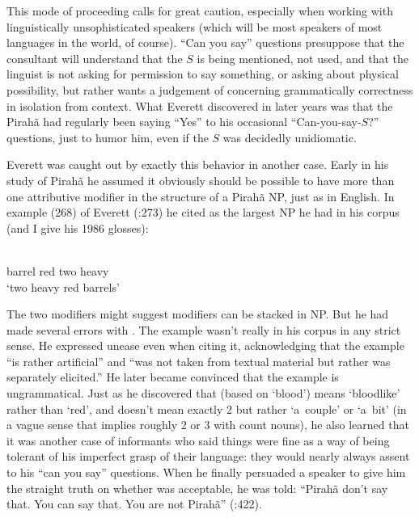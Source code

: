 \documentclass[output=paper,colorlinks,citecolor=brown
]{langscibook}
\begin{document}
This mode of proceeding calls for great caution, especially when
working with linguistically unsophisticated speakers (which will be
most speakers of most languages in the world, of course). ``Can you say''
questions presuppose that the consultant will understand that the $S$
is being mentioned, not used, and that the linguist is not asking
for permission to say something, or asking about physical possibility,
but rather wants a judgement of concerning grammatically correctness
in isolation from context. What Everett discovered in later years was
that the Pirah{\~a} had regularly been saying ``Yes'' to his occasional
``Can-you-say-$S$?'' questions, just to humor him, even if the $S$ was
decidedly unidiomatic.

Everett was caught out by exactly this behavior in another case. Early
in his study of Pirah{\~a} he assumed it obviously should be possible
to have more than one attributive modifier in the structure of a
Pirah{\~a} NP, just as in English. In example (268) of Everett
(\citeyear{Everett86HAL}:273) he cited  as the largest NP he had
in his corpus (and I give his 1986 glosses):

\ea\label{ex:pullum:4}
\gll {}     
      \\
     barrel   red   two   heavy \\
     \glt `two heavy red barrels'
\z

\noindent
The two modifiers might suggest modifiers can be stacked in NP. But
he had made several errors with . The example wasn't really in
his corpus in any strict sense. He expressed unease even when citing
it, acknowledging that the example ``is rather artificial'' and ``was
not taken from textual material but rather was separately elicited.''
He later became convinced that the example is ungrammatical. Just
as he discovered that  (based on 
`blood') means `bloodlike' rather than `red', and 
doesn't mean exactly 2 but rather `a~couple' or `a~bit' (in a vague
sense that implies roughly 2 or 3 with count nouns), he also learned
that it was another case of informants who said things were fine as
a way of being tolerant of his imperfect grasp of their language:
they would nearly always assent to his ``can you say'' questions. When
he finally persuaded a speaker to give him the straight truth on
whether  was acceptable, he was told: ``Pirah{\~a} don't say that.
You can say that. You are not Pirah{\~a}'' (\citealt{Everett09}:422).
\end{document}
